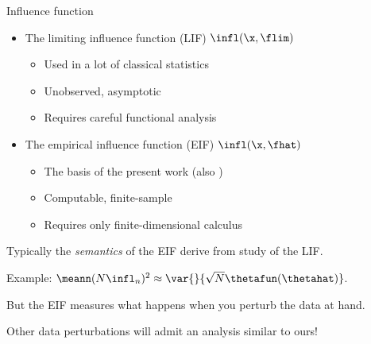 \begin{frame}[t]{Influence function}

\begin{itemize}
%
\item The limiting influence function (LIF) $\infl(\x, \flim)$
    \begin{itemize}
        \item Used in a lot of classical statistics
            \citep{
                mises1947asymptotic,
                huber1981robust, hampel1986robustbook,
                bickel1993semiparametric}
        \item Unobserved, asymptotic
        \item Requires careful functional analysis
            \citep{reeds1976thesis}
    \end{itemize}
\item The empirical influence function (EIF) $\infl(\x, \fhat)$
    \begin{itemize}
        \item The basis of the present work
            (also \citep{giordano2019swiss, giordano2019higherorder})
        \item Computable, finite-sample
        \item Requires only finite-dimensional calculus
    \end{itemize}
%
\end{itemize}

\vspace{1em}
Typically the {\em semantics} of the EIF derive from study of the LIF.

Example: $\meann (N \infl_n)^2 \approx \var{}{\sqrt{N}\thetafun(\thetahat)}$.

\vspace{1em}
But the EIF measures what happens when you perturb the data at hand.

\vspace{1em}
Other data perturbations will admit an analysis similar to ours!

\end{frame}





